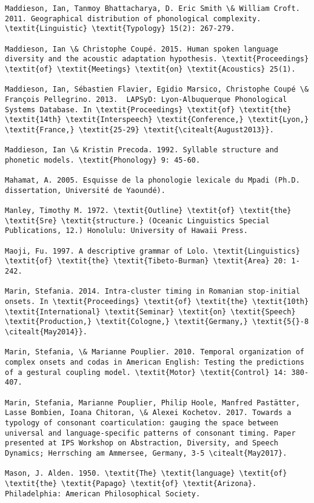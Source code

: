 \begin{verbatim}
Maddieson, Ian, Tanmoy Bhattacharya, D. Eric Smith \& William Croft. 2011. Geographical distribution of phonological complexity. \textit{Linguistic} \textit{Typology} 15(2): 267-279.

Maddieson, Ian \& Christophe Coupé. 2015. Human spoken language diversity and the acoustic adaptation hypothesis. \textit{Proceedings} \textit{of} \textit{Meetings} \textit{on} \textit{Acoustics} 25(1).

Maddieson, Ian, Sébastien Flavier, Egidio Marsico, Christophe Coupé \& François Pellegrino. 2013.  LAPSyD: Lyon-Albuquerque Phonological Systems Database. In \textit{Proceedings} \textit{of} \textit{the} \textit{14th} \textit{Interspeech} \textit{Conference,} \textit{Lyon,} \textit{France,} \textit{25-29} \textit{\citealt{August2013}}.

Maddieson, Ian \& Kristin Precoda. 1992. Syllable structure and phonetic models. \textit{Phonology} 9: 45-60.

Mahamat, A. 2005. Esquisse de la phonologie lexicale du Mpadi (Ph.D. dissertation, Université de Yaoundé).

Manley, Timothy M. 1972. \textit{Outline} \textit{of} \textit{the} \textit{Sre} \textit{structure.} (Oceanic Linguistics Special Publications, 12.) Honolulu: University of Hawaii Press.

Maoji, Fu. 1997. A descriptive grammar of Lolo. \textit{Linguistics} \textit{of} \textit{the} \textit{Tibeto-Burman} \textit{Area} 20: 1-242.

Marin, Stefania. 2014. Intra-cluster timing in Romanian stop-initial onsets. In \textit{Proceedings} \textit{of} \textit{the} \textit{10th} \textit{International} \textit{Seminar} \textit{on} \textit{Speech} \textit{Production,} \textit{Cologne,} \textit{Germany,} \textit{5{}-8 \citealt{May2014}}.

Marin, Stefania, \& Marianne Pouplier. 2010. Temporal organization of complex onsets and codas in American English: Testing the predictions of a gestural coupling model. \textit{Motor} \textit{Control} 14: 380-407.

Marin, Stefania, Marianne Pouplier, Philip Hoole, Manfred Pastätter, Lasse Bombien, Ioana Chitoran, \& Alexei Kochetov. 2017. Towards a typology of consonant coarticulation: gauging the space between universal and language-specific patterns of consonant timing. Paper presented at IPS Workshop on Abstraction, Diversity, and Speech Dynamics; Herrsching am Ammersee, Germany, 3-5 \citealt{May2017}.

Mason, J. Alden. 1950. \textit{The} \textit{language} \textit{of} \textit{the} \textit{Papago} \textit{of} \textit{Arizona}. Philadelphia: American Philosophical Society.


\end{verbatim}
